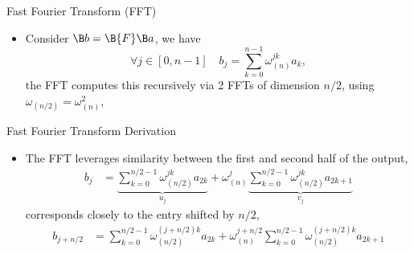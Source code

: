 \begin{frame}{Fast Fourier Transform (FFT)}

\begin{itemize}
\item Consider $\B b=\B{F}\B a$, we have
\[\forall j\in[0,n-1] \quad b_j=\sum_{k=0}^{n-1}\omega_{(n)}^{jk}a_k,\]
the FFT computes this recursively via 2 FFTs of dimension $n/2$, using $\omega_{(n/2)}=\omega_{(n)}^2$,
\lgcond{}
\end{itemize}
\end{frame}


\begin{frame}{Fast Fourier Transform Derivation}

\begin{itemize}
\item The FFT leverages similarity between the first and second half of the output,
\begin{align*}
b_j&=\underbrace{\sum_{k=0}^{n/2-1}\omega_{(n/2)}^{jk}a_{2k}}_{u_j}+\omega_{(n)}^j\underbrace{\sum_{k=0}^{n/2-1}\omega_{(n/2)}^{jk}a_{2k+1}}_{v_j}
\end{align*}
corresponds closely to the entry shifted by $n/2$,
\begin{align*}
 b_{j+n/2}&=\sum_{k=0}^{n/2-1}\omega_{(n/2)}^{(j+n/2)k}a_{2k}+\omega_{(n)}^{j+n/2}\sum_{k=0}^{n/2-1}\omega_{(n/2)}^{(j+n/2)k}a_{2k+1} 
\end{align*}
\end{itemize}
\end{frame}

